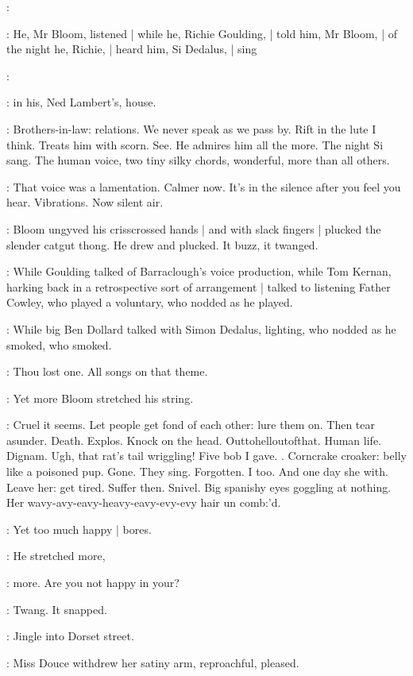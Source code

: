 \simon:

:
He,
Mr Bloom,
listened |
while he,
Richie Goulding, |
told him,
Mr Bloom, |
of the night he,
Richie, |
heard him,
Si Dedalus, |
sing

\simon:

:
in his,
Ned Lambert's,
house.

\BloomInt:
Brothers-in-law:
relations.
We never speak as we pass by.
Rift in the lute I think.
Treats him with scorn.
See.
He admires him all the more.
The night Si sang.
The human voice,
two tiny silky chords,
wonderful,
more than all others.

\BloomInt:
That voice was a lamentation.
Calmer now.
It's in the silence after
you feel you hear.
Vibrations.
Now silent air.

:
Bloom ungyved his crisscrossed hands |
and with slack fingers |
plucked the slender catgut thong.
He drew and plucked.
It buzz,
it twanged.

:
While Goulding talked of Barraclough's voice production,
while Tom Kernan,
harking back in a retrospective sort of arrangement |
talked to listening Father Cowley,
who played a voluntary,
who nodded as he played.

:
While big Ben Dollard talked with Simon Dedalus,
lighting,
who nodded as he smoked,
who smoked.

\BloomInt:
Thou lost one.
All songs on that theme.

:
Yet more Bloom stretched his string.

\BloomInt:
Cruel it seems.
Let people get fond of each other:
lure them on.
Then tear asunder.
Death.
Explos.
Knock on the head.
Outtohelloutofthat.
Human life.
Dignam.
Ugh,
that rat's tail wriggling!
Five bob I gave.
.
Corncrake croaker:
belly like a poisoned pup.
Gone.
They sing.
Forgotten.
I too.
And one day she with.
Leave her:
get tired.
Suffer then.
Snivel.
Big spanishy eyes goggling at nothing.
Her wavy-avy-eavy-heavy-eavy-evy-evy hair un comb:'d.

\BloomInt:
Yet too much happy |
bores.

:
He stretched more,

\BloomInt:
more.
Are you not happy in your?

:
Twang.
It snapped.

:
Jingle into Dorset street.

:
Miss Douce withdrew her satiny arm,
reproachful,
pleased.

